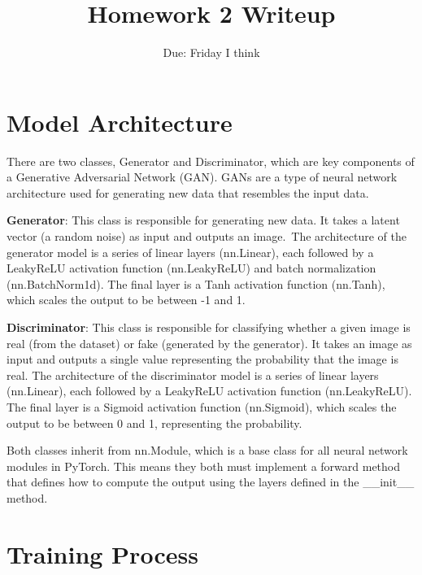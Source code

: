 \documentclass{genai}
\title{Homework 2 Writeup}
\author{Due: Friday I think}
\date{}
\begin{document}

\renewcommand{\labelenumii}{\arabic{enumi}.\arabic{enumii}}
\renewcommand{\labelenumiii}
{\arabic{enumi}.\arabic{enumii}.\arabic{enumiii}}
\pagestyle{fancy}
\newpage

\maketitle

\subtitle

\newpage

\section{Model Architecture}

There are two classes, Generator and Discriminator, which are key components of a Generative Adversarial Network (GAN).
GANs are a type of neural network architecture used for generating new data that resembles the input data.

\textbf{Generator}: This class is responsible for generating new data. It takes a latent vector (a random noise) as input and outputs an image.\
The architecture of the generator model is a series of linear layers (nn.Linear), each followed by a LeakyReLU activation function (nn.LeakyReLU) and batch normalization (nn.BatchNorm1d).
The final layer is a Tanh activation function (nn.Tanh), which scales the output to be between -1 and 1.

\textbf{Discriminator}: This class is responsible for classifying whether a given image is real (from the dataset) or fake (generated by the generator).
It takes an image as input and outputs a single value representing the probability that the image is real.
The architecture of the discriminator model is a series of linear layers (nn.Linear), each followed by a LeakyReLU activation function (nn.LeakyReLU).
The final layer is a Sigmoid activation function (nn.Sigmoid), which scales the output to be between 0 and 1, representing the probability.

Both classes inherit from nn.Module, which is a base class for all neural network modules in PyTorch.
This means they both must implement a forward method that defines how to compute the output using the layers defined in the \_\_init\_\_ method.

\section{Training Process}
\end{document}
